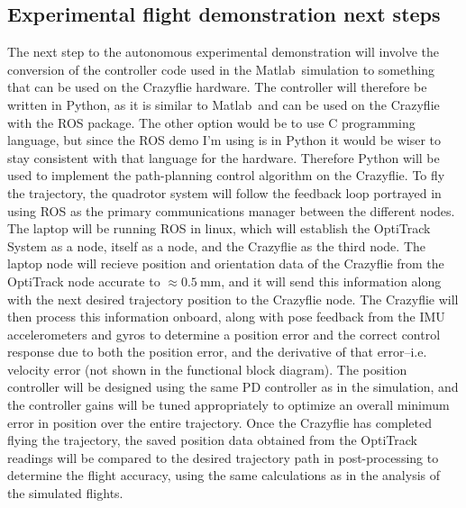 \documentclass[onecolumn,10pt]{IEEEtran}
\newcommand{\MATLAB}{Matlab}
\begin{document}
\subsection{Experimental flight demonstration next steps}
The next step to the autonomous experimental demonstration will involve the conversion of the controller code used in the \MATLAB\ simulation to something that can be used on the Crazyflie hardware. The controller will therefore be written in Python, as it is similar to \MATLAB\ and can be used on the Crazyflie with the ROS package. The other option would be to use C programming language, but since the ROS demo I'm using is in Python it would be wiser to stay consistent with that language for the hardware. Therefore Python will be used to implement the path-planning control algorithm on the Crazyflie. To fly the trajectory, the quadrotor system will follow the feedback loop portrayed in  using ROS as the primary communications manager between the different nodes. The laptop will be running ROS in linux, which will establish the OptiTrack System as a node, itself as a node, and the Crazyflie as the third node. The laptop node will recieve position and orientation data of the Crazyflie from the OptiTrack node accurate to $\approx \SI{0.5}{\milli\meter}$, and it will send this information along with the next desired trajectory position to the Crazyflie node. The Crazyflie will then process this information onboard, along with pose feedback from the IMU accelerometers and gyros to determine a position error and the correct control response due to both the position error, and the derivative of that error--i.e. velocity error (not shown in the functional block diagram). The position controller will be designed using the same PD controller as in the simulation, and the controller gains will be tuned appropriately to optimize an overall minimum error in position over the entire trajectory. Once the Crazyflie has completed flying the trajectory, the saved position data obtained from the OptiTrack readings will be compared to the desired trajectory path in post-processing to determine the flight accuracy, using the same calculations as in the analysis of the simulated flights.
\end{document}
